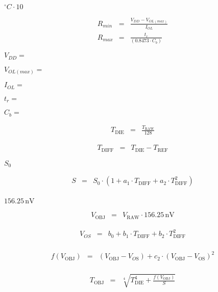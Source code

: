 \documentclass{article}
\begin{document}
$^\circ C \cdot 10$
\pagebreak

\begin{eqnarray*} R_{min} &=& \frac{V_{DD} - V_{OL(max)}} {I_{OL}}\\ R_{max} &=& \frac{t_r} {(0.8473 \cdot C_b)} \end{eqnarray*}
\pagebreak

$ V_{DD} =$
\pagebreak

$ V_{OL(max)} =$
\pagebreak

$ I_{OL} =$
\pagebreak

$ t_r =$
\pagebreak

$ C_b =$
\pagebreak

\begin{eqnarray*} T_{\mathrm{DIE}} &=& \frac{T_{\mathrm{RAW}}}{128} \end{eqnarray*}
\pagebreak

\begin{eqnarray*} T_{\mathrm{DIFF}} &=& T_{\mathrm{DIE}} - T_{\mathrm{REF}} \end{eqnarray*}
\pagebreak

$S_{\mathrm{0}}$
\pagebreak

\begin{eqnarray*} S &=& S_{\mathrm{0}} \cdot ( 1 + a_1 \cdot T_{\mathrm{DIFF}} + a_2 \cdot T_{\mathrm{DIFF}}^2 ) \\ \end{eqnarray*}
\pagebreak

$ 156.25\,\mathrm{nV} $
\pagebreak

\begin{eqnarray*} V_{\mathrm{OBJ}} &=& V_{\mathrm{RAW}} \cdot 156.25\,\mathrm{nV} \end{eqnarray*}
\pagebreak

\begin{eqnarray*} V_{OS} &=& b_0 + b_1 \cdot T_{\mathrm{DIFF}} + b_2 \cdot T_{\mathrm{DIFF}}^2 \\ \end{eqnarray*}
\pagebreak

\begin{eqnarray*} f(V_{\mathrm{OBJ}}) &=& (V_{\mathrm{OBJ}} - V_{O\mathrm{S}}) + c_2 \cdot (V_{\mathrm{OBJ}} - V_{\mathrm{OS}})^2 \\ \end{eqnarray*}
\pagebreak

\begin{eqnarray*} T_{\mathrm{OBJ}} &=& \sqrt[4]{T_{\mathrm{DIE}}^4 + \frac{f(V_{\mathrm{OBJ}})}{S}} \\ \end{eqnarray*}
\pagebreak
\end{document}
